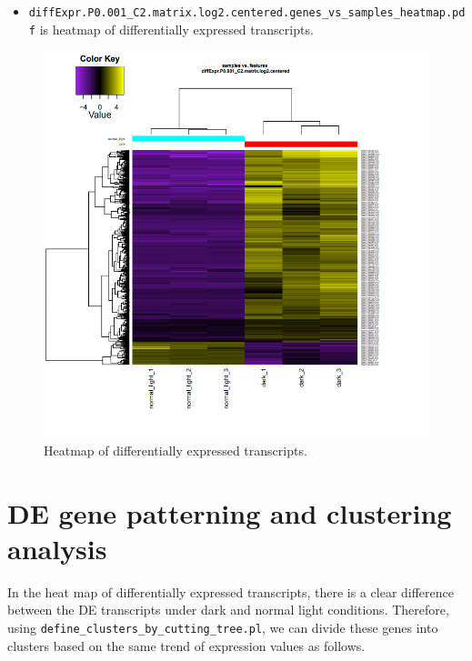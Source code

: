 \documentclass[
  letterpaper,
  DIV=11,
  numbers=noendperiod]{scrreprt}
\providecommand{\tightlist}{%
  \setlength{\itemsep}{0pt}\setlength{\parskip}{0pt}}\usepackage{longtable,booktabs,array}
\begin{document}
\begin{itemize}
\tightlist
\item
  \texttt{diffExpr.P0.001\_C2.matrix.log2.centered.genes\_vs\_samples\_heatmap.pdf}
  is heatmap of differentially expressed transcripts.
\end{itemize}

\begin{figure}

{\centering \includegraphics{assets/36_DE_heatmap.png}

}

\caption{Heatmap of differentially expressed transcripts.}

\end{figure}

\hypertarget{de-gene-patterning-and-clustering-analysis}{%
\section{DE gene patterning and clustering
analysis}\label{de-gene-patterning-and-clustering-analysis}}

In the heat map of differentially expressed transcripts, there is a
clear difference between the DE transcripts under dark and normal light
conditions. Therefore, using
\texttt{define\_clusters\_by\_cutting\_tree.pl}, we can divide these
genes into clusters based on the same trend of expression values as
follows.
\end{document}
